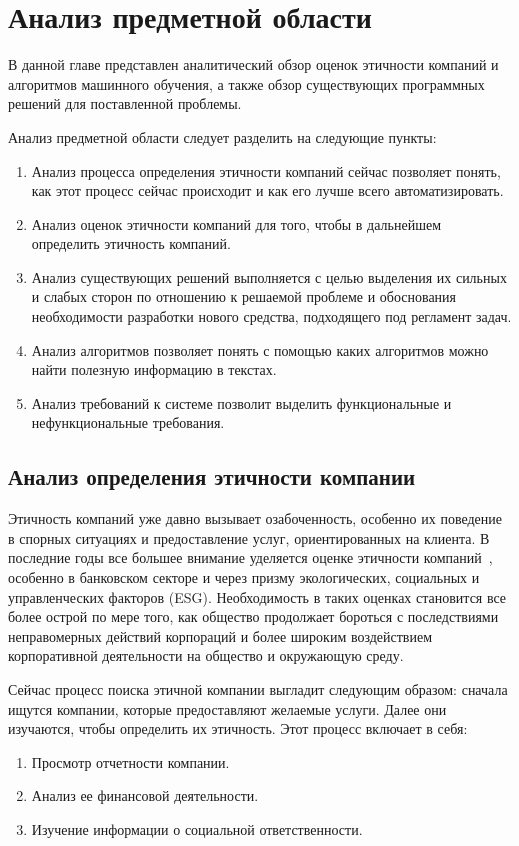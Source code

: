 \documentclass[PI, VKR]{HSEUniversity}
\begin{document}
\chapter{Анализ предметной области}
\label{sec:org21ca6c3}
В данной главе представлен аналитический обзор оценок этичности компаний и алгоритмов машинного обучения, а также обзор существующих программных решений для поставленной проблемы.

Анализ предметной области следует разделить на следующие пункты:
\begin{enumerate}
\item Анализ процесса определения этичности компаний сейчас позволяет понять, как этот процесс сейчас происходит и как его лучше всего автоматизировать.
\item Анализ оценок этичности компаний для того, чтобы в дальнейшем определить этичность компаний.
\item Анализ существующих решений выполняется с целью выделения их сильных и слабых сторон по отношению к решаемой проблеме и обоснования необходимости разработки нового средства, подходящего под регламент задач.
\item Анализ алгоритмов позволяет понять с помощью каких алгоритмов можно найти полезную информацию в текстах.
\item Анализ требований к системе позволит выделить функциональные и нефункциональные требования.
\end{enumerate}
\section{Анализ определения этичности компании}
\label{sec:org09b8762}
Этичность компаний уже давно вызывает озабоченность, особенно их поведение в спорных ситуациях и предоставление услуг, ориентированных на клиента. В последние годы все большее внимание уделяется оценке этичности компаний~\autocites{mure_esg_2021}[][]{semenko_korporativnaya_2022}[][]{kudryavceva_korporativnosocialnaya_2016}, особенно в банковском секторе и через призму экологических, социальных и управленческих факторов (ESG). Необходимость в таких оценках становится все более острой по мере того, как общество продолжает бороться с последствиями неправомерных действий корпораций и более широким воздействием корпоративной деятельности на общество и окружающую среду.

Сейчас процесс поиска этичной компании выгладит следующим образом: сначала ищутся компании, которые предоставляют желаемые услуги. Далее они изучаются, чтобы определить их этичность. Этот процесс включает в себя:
\begin{enumerate}
\item Просмотр отчетности компании.
\item Анализ ее финансовой деятельности.
\item Изучение информации о социальной ответственности.
\end{enumerate}
\end{document}
